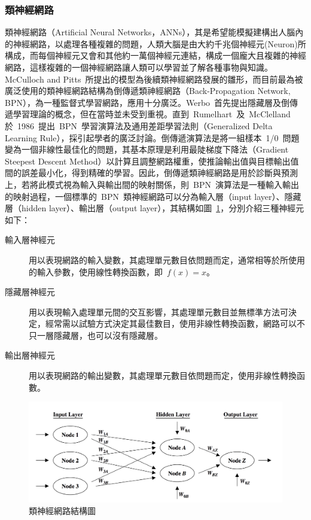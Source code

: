\subsubsection{類神經網路}

類神經網路（Artificial Neural Networks，ANNs），其是希望能模擬建構出人腦內的神經網路，以處理各種複雜的問題，人類大腦是由大約千兆個神經元(Neuron)所構成，而每個神經元又會和其他約一萬個神經元連結，構成一個龐大且複雜的神經網路，這樣複雜的一個神經網路讓人類可以學習並了解各種事物與知識。McCulloch and Pitts~\cite{mcculloch1943logical}所提出的模型為後續類神經網路發展的雛形，而目前最為被廣泛使用的類神經網路結構為倒傳遞類神經網路（Back-Propagation Network, BPN），為一種監督式學習網路，應用十分廣泛。Werbo~\cite{werbos1974beyond}首先提出隱藏層及倒傳遞學習理論的概念，但在當時並未受到重視。直到~Rumelhart~及~McClelland\cite{rummelhart1986learning}於~1986~提出~BPN~學習演算法及通用差距學習法則（Generalized Delta Learning Rule），採引起學者的廣泛討論。倒傳遞演算法是將一組樣本~1/0~問題變為一個非線性最佳化的問題，其基本原理是利用最陡梯度下降法（Gradient Steepest Descent Method）以計算且調整網路權重，使推論輸出值與目標輸出值間的誤差最小化，得到精確的學習。因此，倒傳遞類神經網路是用於診斷與預測上，若將此模式視為輸入與輸出間的映射關係，則~BPN~演算法是一種輸入輸出的映射過程，一個標準的~BPN~類神經網路可以分為輸入層（input layer）、隱藏層（hidden layer）、輸出層（output layer），其結構如圖~\ref{fig:ANN-network}\cite{larose2005discovering}，分別介紹三種神經元如下：

\begin{description}
  \item [輸入層神經元]
  用以表現網路的輸入變數，其處理單元數目依問題而定，通常相等於所使用的輸入參數，使用線性轉換函數，即~$f(x)=x$。
  \item [隱藏層神經元]
  用以表現輸入處理單元間的交互影響，其處理單元數目並無標準方法可決定，經常需以試驗方式決定其最佳數目，使用非線性轉換函數，網路可以不只一層隱藏層，也可以沒有隱藏層。
  \item [輸出層神經元]
  用以表現網路的輸出變數，其處理單元數目依問題而定，使用非線性轉換函數。
\end{description}

\begin{figure}[hbtp]
  \begin{center}
    \includegraphics[width=1.0\textwidth]{figures/anns-network.png}
    \caption{類神經網路結構圖} 
    \label{fig:ANN-network}
  \end{center}
\end{figure}

